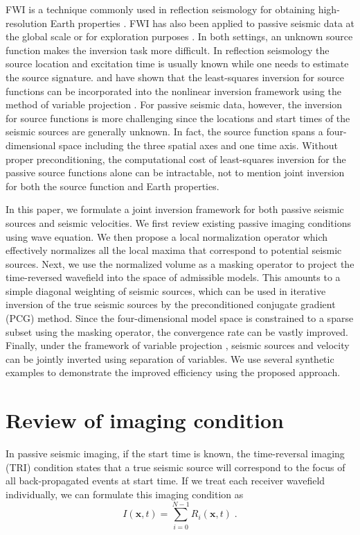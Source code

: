 FWI is a technique commonly used in reflection seismology for obtaining high-resolution Earth properties \cite[]{plessix09,virieux09,warner13}. FWI has also been applied to passive seismic data at the global scale \cite[]{tromp05,kim11,zhu15} or for exploration purposes \cite[]{kamei14,behura15}. In both settings, an unknown source function makes the inversion task more difficult. In reflection seismology the source location and excitation time is usually known while one needs to estimate the source signature. \cite{aravkin12} and \cite{rickett13} have shown that the least-squares inversion for source functions can be incorporated into the nonlinear inversion framework using the method of variable projection \cite[]{golub73}. For passive seismic data, however, the inversion for source functions is more challenging since the locations and start times of the seismic sources are generally unknown. In fact, the source function spans a four-dimensional space including the three spatial axes and one time axis. Without proper preconditioning, the computational cost of least-squares inversion for the passive source functions alone can be intractable, not to mention joint inversion for both the source function and Earth properties.

In this paper, we formulate a joint inversion framework for both passive seismic sources and seismic velocities. We first review existing passive imaging conditions using wave equation. We then propose a local normalization operator which effectively normalizes all the local maxima that correspond to potential seismic sources. Next, we use the normalized volume as a masking operator to project the time-reversed wavefield into the space of admissible models. This amounts to a simple diagonal weighting of seismic sources, which can be used in iterative inversion of the true seismic sources by the preconditioned conjugate gradient (PCG) method. Since the four-dimensional model space is constrained to a sparse subset using the masking operator, the convergence rate can be vastly improved. Finally, under the framework of variable projection \cite[]{golub73,rickett13}, seismic sources and velocity can be jointly inverted using separation of variables. We use several synthetic examples to demonstrate the improved efficiency using the proposed approach.

\section{Review of imaging condition}
In passive seismic imaging, if the start time is known, the time-reversal imaging (TRI) condition states that a true seismic source will correspond to the focus of all back-propagated events at start time. If we treat each receiver wavefield individually, we can formulate this imaging condition as 
\begin{equation}
\label{eq:ic-sum}
I(\mathbf{x},t) = \sum\limits_{i=0}^{N-1} R_i(\mathbf{x},t) \; .
\end{equation}

